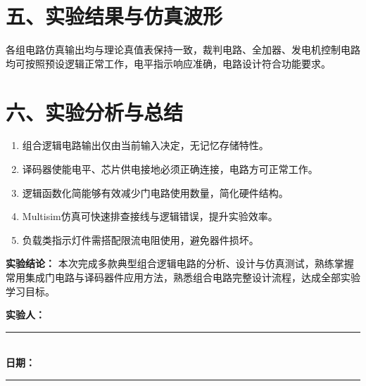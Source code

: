 \documentclass[12pt,a4paper]{article}
\begin{document}
\section{五、实验结果与仿真波形}
各组电路仿真输出均与理论真值表保持一致，裁判电路、全加器、发电机控制电路均可按照预设逻辑正常工作，电平指示响应准确，电路设计符合功能要求。

\section{六、实验分析与总结}
\begin{enumerate}[itemsep=3pt]
    \item 组合逻辑电路输出仅由当前输入决定，无记忆存储特性。
    \item 译码器使能电平、芯片供电接地必须正确连接，电路方可正常工作。
    \item 逻辑函数化简能够有效减少门电路使用数量，简化硬件结构。
    \item Multisim仿真可快速排查接线与逻辑错误，提升实验效率。
    \item 负载类指示灯件需搭配限流电阻使用，避免器件损坏。
\end{enumerate}

\textbf{实验结论：}
本次完成多款典型组合逻辑电路的分析、设计与仿真测试，熟练掌握常用集成门电路与译码器件应用方法，熟悉组合电路完整设计流程，达成全部实验学习目标。

\vspace{2em}
\begin{flushright}
\textbf{实验人：}\rule{4cm}{0.5pt}\\
\textbf{日期：}\rule{4cm}{0.5pt}
\end{flushright}
\end{document}
